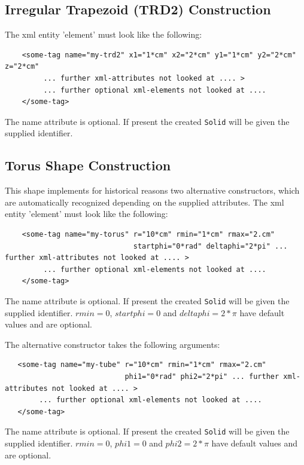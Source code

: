 \subsection{Irregular Trapezoid (TRD2) Construction}
\label{sec:dd4hep-manual-plugin-trd2-shape}

The xml entity 'element' must look like the following:
\begin{verbatim}
    <some-tag name="my-trd2" x1="1*cm" x2="2*cm" y1="1*cm" y2="2*cm" z="2*cm"
         ... further xml-attributes not looked at .... >
         ... further optional xml-elements not looked at .... 
    </some-tag>
\end{verbatim}
The name attribute is optional. If present the created \texttt{Solid} will be given the supplied identifier.


\subsection{Torus Shape Construction}
\label{sec:dd4hep-manual-plugin-torus-shape}

This shape implements for historical reasons two alternative constructors,
which are automatically recognized depending on the supplied attributes.
The xml entity 'element' must look like the following:
\begin{verbatim}
    <some-tag name="my-torus" r="10*cm" rmin="1*cm" rmax="2.cm" 
                              startphi="0*rad" deltaphi="2*pi" ... further xml-attributes not looked at .... >
         ... further optional xml-elements not looked at .... 
    </some-tag>
\end{verbatim}
The name attribute is optional. If present the created \texttt{Solid} will be given the supplied identifier.
$rmin=0$, $startphi=0$ and $deltaphi=2*\pi$ have default values and are optional.

The alternative constructor takes the following arguments:
\begin{verbatim}
   <some-tag name="my-tube" r="10*cm" rmin="1*cm" rmax="2.cm" 
                            phi1="0*rad" phi2="2*pi" ... further xml-attributes not looked at .... >
        ... further optional xml-elements not looked at .... 
   </some-tag>
\end{verbatim}
The name attribute is optional. If present the created \texttt{Solid} will be given the supplied identifier.
$rmin=0$, $phi1=0$ and $phi2=2*\pi$ have default values and are optional.

